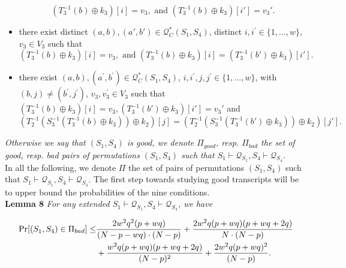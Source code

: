 \begin{itemize}
  $$\left(T_{3}^{-1}\left(b\right) \oplus k_{3}\right)[i] = v_3,\text{ and }
  \left(T_{3}^{-1}\left(b\right) \oplus k_{3}\right)[i'] = v_3'.$$
  \item[\ceight]
  there exist distinct $(a, b),(a',b') \in \mathcal{Q}_{C}^{*}\left(S_{1}, S_{4}\right)$, distinct $i, i^{\prime}\in\{1, \ldots, w\}$, $v_{3} \in V_{3}$ such that
  $$\left(T_{3}^{-1}\left(b\right) \oplus k_{3}\right)[i] = v_3,\text{ and }
 \left(T_{3}^{-1}\left(b\right) \oplus k_{3}\right)[i] =\left(T_{3}^{-1}\left(b'\right) \oplus k_{3}\right)[i'].$$
  \item[\cnine]
  there exist $(a, b), (a^{\prime}, b^{\prime}) \in \mathcal{Q}_{C}^{*}\left(S_{1}, S_{4}\right)$, $i, i^{\prime}, j, j^{\prime} \in\{1, \ldots, w\}$, with$(b, j) \neq \left(b^{\prime}, j^{\prime}\right)$, $v_{3},v_{3}^{\prime} \in V_{3}$ such that $\left(T_{3}^{-1}\left(b\right) \oplus k_{3}\right)[i] = v_3, \left(T_{3}^{-1}\left(b'\right) \oplus k_{3}\right)[i'] = v_3'$ and
$$
  \left(T_{2}^{-1}\left(S_{3}^{-1}\left(T_{3}^{-1}\left(b\right) \oplus k_{3}\right)\right) \oplus k_{2}\right)[j]= \left(T_{2}^{-1}\left(S_{3}^{-1}\left(T_{3}^{-1}\left(b'\right) \oplus k_{3}\right)\right) \oplus k_{2}\right)[j'].
$$
\end{itemize}

\noindent \emph{Otherwise we say that $(S_{1}, S_{4})$ is good, we denote $\Pi_{good}$, resp. $\Pi_{bad}$ the set of good, resp. bad pairs of permutations $(S_{1}, S_{4})$ such that $S_{1} \vdash \mathcal{Q}_{S_{1}}, S_{4} \vdash \mathcal{Q}_{S_{4}}$.}\\ 

In all the following, we denote \emph{$\Pi$} the set of pairs of permutations $(S_{1}, S_{4})$ such that $S_{1} \vdash \mathcal{Q}_{S_{1}}, S_{4} \vdash \mathcal{Q}_{S_{4}}$. The first step towards studying good transcripts will be to upper bound the probabilities of the nine conditions.\\ 

\noindent \textbf{Lemma 8} \emph{ For any extended $S_{1} \vdash \mathcal{Q}_{S_{1}},S_{4} \vdash \mathcal{Q}_{S_{4}}$, we have}

\begin{equation}
\begin{aligned}
\operatorname{Pr}[(S_1,S_4) \in \emph{$\Pi_{bad}$}] \leq  &\frac{2 w^{2} q^{2} (p+w q)}{(N- p- wq) \cdot (N-p)} +\frac{2 w^{2} q (p+w q)(p+w q+2 q)}{N \cdot (N-p)}\\
& + \frac{w^{2} q (p+w q)(p+w q+2 q)}{(N-p)^2} + \frac{2 w^{2} q (p+w q)^{2}}{(N-p)}.
\end{aligned}
\end{equation}

